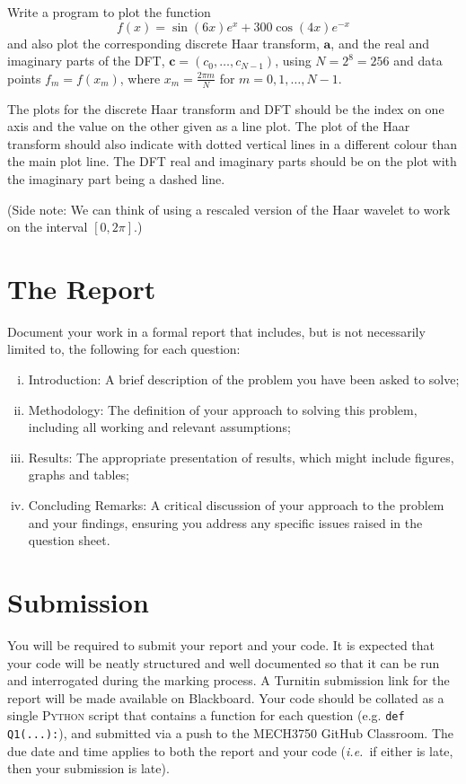 \documentclass[12pt]{article}
\begin{document}
\begin{enumerate}[a.]
\medskip

Write a program to plot the function
\[
f(x) = \sin(6x) e^x + 300 \cos(4x) e^{-x}
\]
and also plot the corresponding discrete Haar transform, $\mathbf{a}$, and the real and imaginary parts of the DFT, $\mathbf{c} = (c_0, \dotsc, c_{N-1})$, using $N = 2^8 = 256$ and data points $f_m = f(x_m)$, where $x_m = \frac{2\pi m}{N}$ for $m = 0,1,\ldots,N-1$.

\smallskip
The plots for the discrete Haar transform and DFT should be the index on one axis and the value on the other given as a line plot.
The plot of the Haar transform should also indicate with dotted vertical lines in a different colour than the main plot line.
The DFT real and imaginary parts should be on the plot with the imaginary part being a dashed line.

\smallskip
(Side note: We can think of using a rescaled version of the Haar wavelet to work on the interval $[0, 2\pi]$.)
\end{enumerate}


\clearpage

\section{\fontsize{14}{14}\selectfont The Report}
Document your work in a formal report that includes, but is not necessarily limited to, the following for each question:

\begin{enumerate}[i.]
    
    \item 
    Introduction: A brief description of the problem you have been asked to solve;
    
    \item
    Methodology: The definition of your approach to solving this problem, including all working and relevant assumptions;
    
    \item
    Results: The appropriate presentation of results, which might include figures, graphs and tables;
    
    \item
    Concluding Remarks: A critical discussion of your approach to the problem and your findings, ensuring you address any specific issues raised in the question sheet.
    
\end{enumerate}

\section{\fontsize{14}{14}\selectfont Submission}
You will be required to submit your report and your code. It is expected that your code will be neatly structured and well documented so that it can be run and interrogated during the marking process. A Turnitin submission link for the report will be made available on Blackboard. Your code should be collated as a single \textsc{Python} script that contains a function for each question (e.g. \texttt{def Q1(...):}), and submitted via a push to the MECH3750 GitHub Classroom. The due date and time applies to both the report and your code (\textit{i.e.}\ if either is late, then your submission is late).
\end{document}
